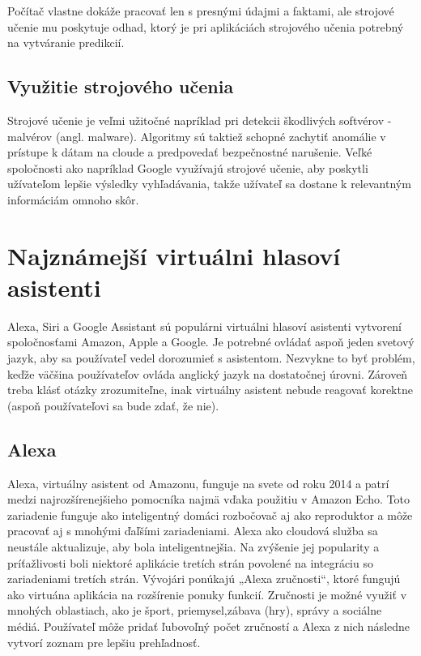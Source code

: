 \documentclass[10pt,twoside,slovak,coursepaper]{article}
\begin{document}
Počítač vlastne dokáže pracovať len s presnými údajmi a faktami, ale strojové učenie mu poskytuje odhad, ktorý je pri aplikáciách strojového učenia potrebný na vytváranie predikcií.

\subsection{Využitie strojového učenia}
Strojové  učenie je veľmi užitočné napríklad pri detekcii škodlivých softvérov - malvérov (angl. malware). Algoritmy sú taktiež schopné zachytiť anomálie v prístupe k dátam na cloude a predpovedať bezpečnostné narušenie. Veľké spoločnosti ako napríklad Google využívajú strojové učenie, aby poskytli užívateľom lepšie výsledky vyhľadávania, takže užívateľ sa dostane k relevantným informáciám omnoho skôr. \cite{Labus}

\section{Najznámejší virtuálni hlasoví asistenti}
Alexa, Siri a Google Assistant sú populárni virtuálni hlasoví asistenti vytvorení spoločnosťami Amazon, Apple a Google. Je potrebné ovládať aspoň jeden svetový jazyk, aby sa používateľ vedel dorozumieť s asistentom. Nezvykne to byť problém, keďže väčšina používateľov ovláda anglický jazyk na dostatočnej úrovni. Zároveň treba klásť otázky zrozumiteľne, inak virtuálny asistent nebude reagovať korektne (aspoň používateľovi sa bude zdať, že nie).\cite{Kadlec}

\subsection{Alexa}
Alexa, virtuálny asistent od Amazonu, funguje na svete od roku 2014 a patrí medzi najrozšírenejšieho pomocníka najmä vďaka použitiu v Amazon Echo. Toto zariadenie funguje ako inteligentný domáci rozbočovač aj ako reproduktor a môže pracovať aj s mnohými ďaľšími zariadeniami. Alexa ako cloudová služba sa neustále aktualizuje, aby bola inteligentnejšia. Na zvýšenie jej popularity a príťažlivosti boli niektoré aplikácie tretích strán povolené na integráciu so zariadeniami tretích strán.
Vývojári ponúkajú  „Alexa zručnosti“, ktoré fungujú ako virtuána aplikácia na rozšírenie ponuky funkcií. Zručnosti je možné využiť v mnohých oblastiach, ako je šport, priemysel,zábava (hry), správy a sociálne médiá. Používateľ môže pridať ľubovoľný počet zručností a Alexa z nich následne vytvorí zoznam pre lepšiu prehľadnosť. \cite{Strephon}
\end{document}
